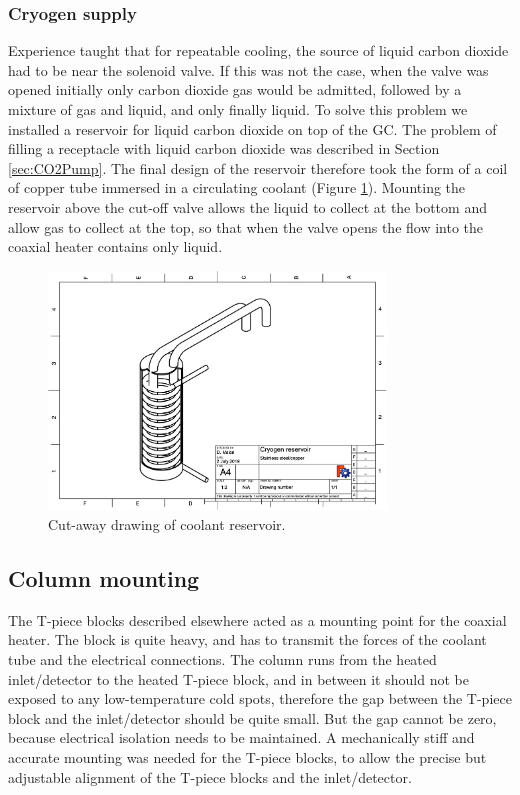 \subsubsection{Cryogen supply}

Experience taught that for repeatable cooling, the source of liquid carbon
dioxide had to be near the solenoid valve. If this was not the case, when the
valve was opened initially only carbon dioxide gas would be admitted, followed
by a mixture of gas and liquid, and only finally liquid. To solve this problem
we installed a reservoir for liquid carbon dioxide on top of the GC. The problem
of filling a receptacle with liquid carbon dioxide was described in Section
\ref{sec:CO2Pump}. The final design of the reservoir therefore took the form of
a coil of copper tube immersed in a circulating coolant (Figure
\ref{fig:CryogenReservoir}). Mounting the reservoir above the cut-off valve
allows the liquid to collect at the bottom and allow gas to collect at the top,
so that when the valve opens the flow into the coaxial heater contains only
liquid.

\begin{figure}
	\centering
	\includegraphics[angle=90, origin=c, width=0.8\textwidth]{./Figures/CryogenReservoir.pdf}
	\decoRule
	\caption[Coolant reservoir]{Cut-away drawing of coolant reservoir.}	
	\label{fig:CryogenReservoir}
\end{figure}


\subsection{Column mounting}

The T-piece blocks described elsewhere acted as a mounting point for the coaxial heater. The block is
quite heavy, and has to transmit the forces of the coolant tube and the
electrical connections. The column runs from the heated inlet/detector to the
heated T-piece block, and in between it should not be exposed to any
low-temperature cold spots, therefore the gap between the T-piece block and the
inlet/detector should be quite small. But the gap cannot be zero, because
electrical isolation needs to be maintained. A mechanically stiff and accurate
mounting was needed for the T-piece blocks, to allow the precise but
adjustable alignment of the T-piece blocks and the inlet/detector.

